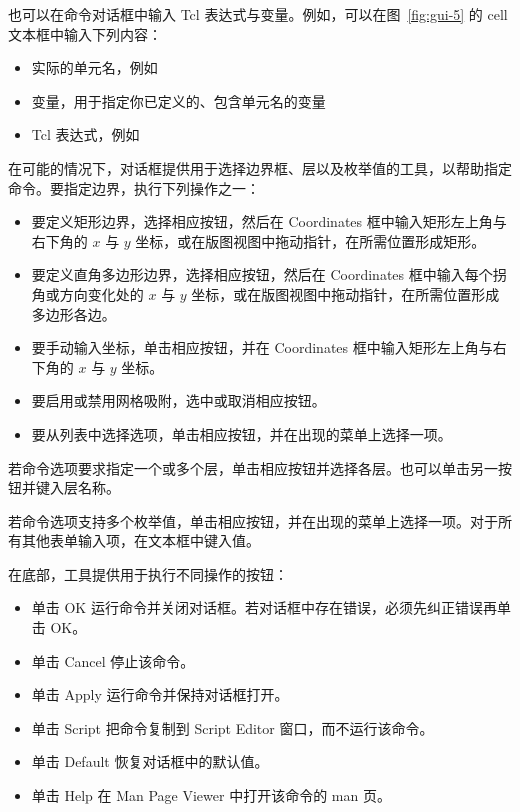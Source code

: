也可以在命令对话框中输入 Tcl 表达式与变量。例如，可以在图~\ref{fig:gui-5} 的 cell 文本框中输入下列内容：
\begin{itemize}
  \item 实际的单元名，例如 
  \item {} 变量，用于指定你已定义的、包含单元名的变量
  \item Tcl 表达式，例如 
\end{itemize}

在可能的情况下，对话框提供用于选择边界框、层以及枚举值的工具，以帮助指定命令。要指定边界，执行下列操作之一：
\begin{itemize}
  \item 要定义矩形边界，选择相应按钮，然后在 Coordinates 框中输入矩形左上角与右下角的 $x$ 与 $y$ 坐标，或在版图视图中拖动指针，在所需位置形成矩形。
  \item 要定义直角多边形边界，选择相应按钮，然后在 Coordinates 框中输入每个拐角或方向变化处的 $x$ 与 $y$ 坐标，或在版图视图中拖动指针，在所需位置形成多边形各边。
  \item 要手动输入坐标，单击相应按钮，并在 Coordinates 框中输入矩形左上角与右下角的 $x$ 与 $y$ 坐标。
  \item 要启用或禁用网格吸附，选中或取消相应按钮。
  \item 要从列表中选择选项，单击相应按钮，并在出现的菜单上选择一项。
\end{itemize}

若命令选项要求指定一个或多个层，单击相应按钮并选择各层。也可以单击另一按钮并键入层名称。

若命令选项支持多个枚举值，单击相应按钮，并在出现的菜单上选择一项。对于所有其他表单输入项，在文本框中键入值。

在底部，工具提供用于执行不同操作的按钮：
\begin{itemize}
  \item 单击 OK 运行命令并关闭对话框。若对话框中存在错误，必须先纠正错误再单击 OK。
  \item 单击 Cancel 停止该命令。
  \item 单击 Apply 运行命令并保持对话框打开。
  \item 单击 Script 把命令复制到 Script Editor 窗口，而不运行该命令。
  \item 单击 Default 恢复对话框中的默认值。
  \item 单击 Help 在 Man Page Viewer 中打开该命令的 man 页。
\end{itemize}

